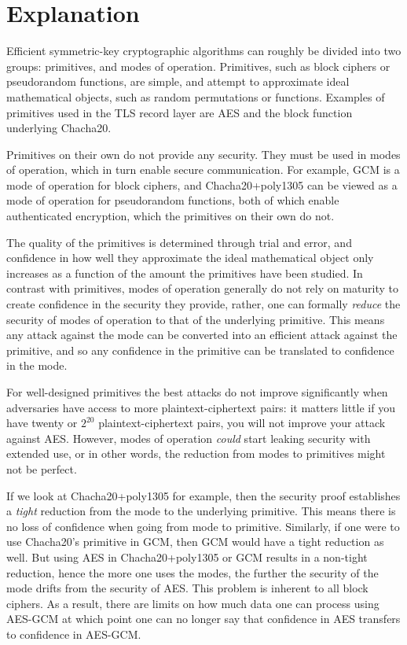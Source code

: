 \documentclass{article}
\begin{document}
\section{Explanation}\label{sec:explanation}
Efficient symmetric-key cryptographic algorithms can roughly be divided into two groups: primitives, and modes of operation. Primitives, such as block ciphers or pseudorandom functions, are simple, and attempt to approximate ideal mathematical objects, such as random permutations or functions. Examples of primitives used in the TLS record layer are AES and the block function underlying Chacha20. 

Primitives on their own do not provide any security. They must be used in modes of operation, which in turn enable secure communication. For example, GCM is a mode of operation for block ciphers, and Chacha20+poly1305 can be viewed as a mode of operation for pseudorandom functions, both of which enable authenticated encryption, which the primitives on their own do not.

The quality of the primitives is determined through trial and error, and confidence in how well they approximate the ideal mathematical object only increases as a function of the amount the primitives have been studied. In contrast with primitives, modes of operation generally do not rely on maturity to create confidence in the security they provide, rather, one can formally \emph{reduce} the security of modes of operation to that of the underlying primitive. This means any attack against the mode can be converted into an efficient attack against the primitive, and so any confidence in the primitive can be translated to confidence in the mode.

For well-designed primitives the best attacks do not improve significantly when adversaries have access to more plaintext-ciphertext pairs: it matters little if you have twenty or $2^{20}$ plaintext-ciphertext pairs, you will not improve your attack against AES. However, modes of operation \emph{could} start leaking security with extended use, or in other words, the reduction from modes to primitives might not be perfect.

If we look at Chacha20+poly1305 for example, then the security proof establishes a \emph{tight} reduction from the mode to the underlying primitive. This means there is no loss of confidence when going from mode to primitive. Similarly, if one were to use Chacha20's primitive in GCM, then GCM would have a tight reduction as well. But using AES in Chacha20+poly1305 or GCM results in a non-tight reduction, hence the more one uses the modes, the further the security of the mode drifts from the security of AES. This problem is inherent to all block ciphers. As a result, there are limits on how much data one can process using AES-GCM at which point one can no longer say that confidence in AES transfers to confidence in AES-GCM.
\end{document}
